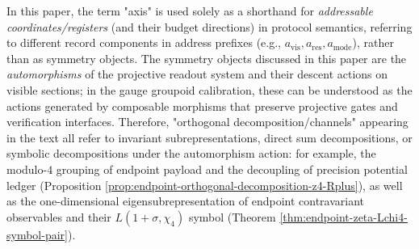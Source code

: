 \begin{remark}\label{rem:axis-vs-automorphism-terminology}
In this paper, the term "axis" is used solely as a shorthand for \emph{addressable coordinates/registers} (and their budget directions) in protocol semantics, referring to different record components in address prefixes (e.g., \(a_{\mathrm{vis}},a_{\mathrm{res}},a_{\mathrm{mode}}\)), rather than as symmetry objects.
The symmetry objects discussed in this paper are the \emph{automorphisms} of the projective readout system and their descent actions on visible sections; in the gauge groupoid calibration, these can be understood as the actions generated by composable morphisms that preserve projective gates and verification interfaces.
Therefore, "orthogonal decomposition/channels" appearing in the text all refer to invariant subrepresentations, direct sum decompositions, or symbolic decompositions under the automorphism action: for example, the modulo-\(4\) grouping of endpoint payload and the decoupling of precision potential ledger (Proposition \ref{prop:endpoint-orthogonal-decomposition-z4-Rplus}), as well as the one-dimensional eigensubrepresentation of endpoint contravariant observables and their \(L(1+\sigma,\chi_4)\) symbol (Theorem \ref{thm:endpoint-zeta-Lchi4-symbol-pair}).
\end{remark}

